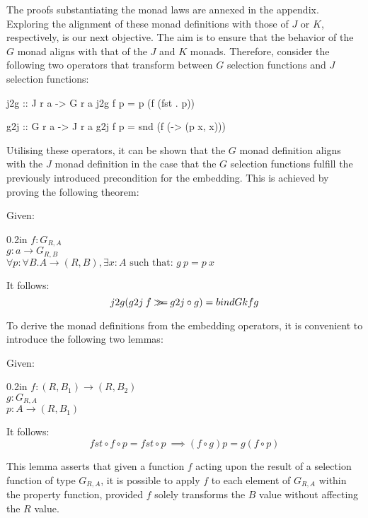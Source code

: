 \documentclass[runningheads]{llncs}
\newenvironment{reasoning}{\begin{adjustwidth}{0.2in}{}\noindent}{\end{adjustwidth}}
\begin{document}
The proofs substantiating the monad laws are annexed in the appendix.
Exploring the alignment of these monad definitions with those of \(J\)
or \(K\), respectively, is our next objective. The aim is to ensure that
the behavior of the \(G\) monad aligns with that of the \(J\) and \(K\)
monads. Therefore, consider the following two operators that transform
between \(G\) selection functions and \(J\) selection functions:

\begin{code}
j2g :: J r a -> G r a
j2g f p = p (f (fst . p))
\end{code}

\begin{code}
g2j :: G r a -> J r a
g2j f p = snd (f (\x -> (p x, x)))
\end{code}

Utilising these operators, it can be shown that the \(G\) monad
definition aligns with the \(J\) monad definition in the case that the
\(G\) selection functions fulfill the previously introduced precondition
for the embedding. This is achieved by proving the following theorem:

\begin{theorem}
Given:
\begin{reasoning}
  $f : G_{R,A} $\\
  $g : a \rightarrow G_{R,B} $\\
  $\forall p : \forall B . A \rightarrow (R,B), \exists x : A \text{ such that: } 
  g\:p = p\:x$
\end{reasoning}
It follows:
  \[j2g (g2j\:f \mathbin{>\!\!\!>\mkern-6.7mu=} g2j \circ g) = bindGk f g\]
\end{theorem}

To derive the monad definitions from the embedding operators, it is
convenient to introduce the following two lemmas:

\newpage
\begin{lemma}
Given:
\begin{reasoning}
$f : (R,B_1) \rightarrow (R,B_2)$\\
$g : G_{R,A}$\\
$p : A \rightarrow (R,B_1)$
\end{reasoning}
It follows:
\[fst \circ f \circ p = fst \circ p\ \implies (f \circ g)p = g (f \circ p)\]
\end{lemma}

This lemma asserts that given a function \(f\) acting upon the result of
a selection function of type \(G_{R,A}\), it is possible to apply \(f\)
to each element of \(G_{R,A}\) within the property function, provided
\(f\) solely transforms the \(B\) value without affecting the \(R\)
value.
\end{document}
